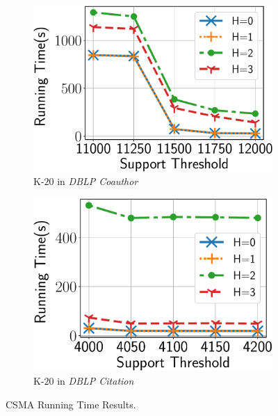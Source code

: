 \begin{figure}
\begin{subfigure}[b]{0.25\textwidth}
		\includegraphics[keepaspectratio, scale=0.24, angle=0]{img2/coauthordblp/coauthordblp_running_time_nobound.pdf}
		\caption{\scriptsize {\sf K-$20$} in {\em DBLP Coauthor}}
		\label{fig:coauthordblp_nosb}
	\end{subfigure}%
	\begin{subfigure}[b]{0.25\textwidth}
		\includegraphics[scale=0.24, angle=0]{img2/citationdblp/citationdblp_running_time_nobound.pdf}
		\caption{\scriptsize {\sf K-$20$} in {\em DBLP Citation}}
		\label{fig:citation_nosb}
	\end{subfigure}%
	\vspace{-2mm}
	\caption{\scriptsize CSMA Running Time Results.}
	\label{fig:approx_nobound}
	\vspace{-4mm}
	\end{figure}
	




